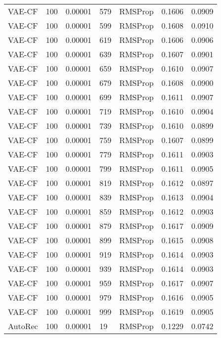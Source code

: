 \begin{tabular}{llrllrr}
  VAE-CF &  100 &  0.00001 &   579 &   RMSProp &  0.1606 &       0.0909 \\
  VAE-CF &  100 &  0.00001 &   599 &   RMSProp &  0.1608 &       0.0910 \\
  VAE-CF &  100 &  0.00001 &   619 &   RMSProp &  0.1606 &       0.0906 \\
  VAE-CF &  100 &  0.00001 &   639 &   RMSProp &  0.1607 &       0.0901 \\
  VAE-CF &  100 &  0.00001 &   659 &   RMSProp &  0.1610 &       0.0907 \\
  VAE-CF &  100 &  0.00001 &   679 &   RMSProp &  0.1608 &       0.0900 \\
  VAE-CF &  100 &  0.00001 &   699 &   RMSProp &  0.1611 &       0.0907 \\
  VAE-CF &  100 &  0.00001 &   719 &   RMSProp &  0.1610 &       0.0904 \\
  VAE-CF &  100 &  0.00001 &   739 &   RMSProp &  0.1610 &       0.0899 \\
  VAE-CF &  100 &  0.00001 &   759 &   RMSProp &  0.1607 &       0.0899 \\
  VAE-CF &  100 &  0.00001 &   779 &   RMSProp &  0.1611 &       0.0903 \\
  VAE-CF &  100 &  0.00001 &   799 &   RMSProp &  0.1611 &       0.0905 \\
  VAE-CF &  100 &  0.00001 &   819 &   RMSProp &  0.1612 &       0.0897 \\
  VAE-CF &  100 &  0.00001 &   839 &   RMSProp &  0.1613 &       0.0904 \\
  VAE-CF &  100 &  0.00001 &   859 &   RMSProp &  0.1612 &       0.0903 \\
  VAE-CF &  100 &  0.00001 &   879 &   RMSProp &  0.1617 &       0.0909 \\
  VAE-CF &  100 &  0.00001 &   899 &   RMSProp &  0.1615 &       0.0908 \\
  VAE-CF &  100 &  0.00001 &   919 &   RMSProp &  0.1614 &       0.0903 \\
  VAE-CF &  100 &  0.00001 &   939 &   RMSProp &  0.1614 &       0.0903 \\
  VAE-CF &  100 &  0.00001 &   959 &   RMSProp &  0.1617 &       0.0907 \\
  VAE-CF &  100 &  0.00001 &   979 &   RMSProp &  0.1616 &       0.0905 \\
  VAE-CF &  100 &  0.00001 &   999 &   RMSProp &  0.1619 &       0.0905 \\
 AutoRec &  100 &  0.00001 &    19 &   RMSProp &  0.1229 &       0.0742 \\

\end{tabular}
